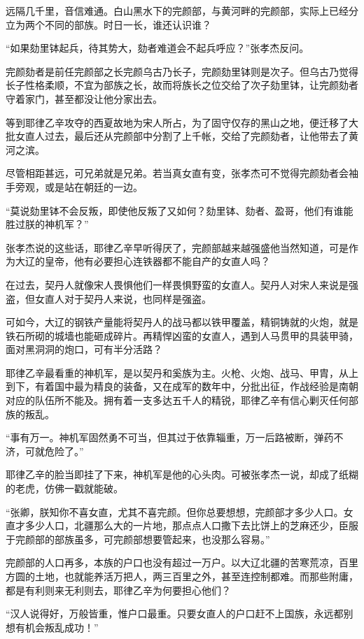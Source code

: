 远隔几千里，音信难通。白山黑水下的完颜部，与黄河畔的完颜部，实际上已经分立为两个不同的部族。时日一长，谁还认识谁？

“如果劾里钵起兵，待其势大，劾者难道会不起兵呼应？”张孝杰反问。

完颜劾者是前任完颜部之长完颜乌古乃长子，完颜劾里钵则是次子。但乌古乃觉得长子性格柔顺，不宜为部族之长，故而将族长之位交给了次子劾里钵，让完颜劾者守着家门，甚至都没让他分家出去。

等到耶律乙辛攻夺的西夏故地为宋人所占，为了固守仅存的黑山之地，便迁移了大批女直人过去，最后还从完颜部中分割了上千帐，交给了完颜劾者，让他带去了黄河之滨。

尽管相距甚远，可兄弟就是兄弟。若当真女直有变，张孝杰可不觉得完颜劾者会袖手旁观，或是站在朝廷的一边。

“莫说劾里钵不会反叛，即使他反叛了又如何？劾里钵、劾者、盈哥，他们有谁能胜过朕的神机军？”

张孝杰说的这些话，耶律乙辛早听得厌了，完颜部越来越强盛他当然知道，可是作为大辽的皇帝，他有必要担心连铁器都不能自产的女直人吗？

在过去，契丹人就像宋人畏惧他们一样畏惧野蛮的女直人。契丹人对宋人来说是强盗，但女直人对于契丹人来说，也同样是强盗。

可如今，大辽的钢铁产量能将契丹人的战马都以铁甲覆盖，精铜铸就的火炮，就是铁石所砌的城墙也能砸成碎片。再精悍凶蛮的女直人，遇到人马贯甲的具装甲骑，面对黑洞洞的炮口，可有半分活路？

耶律乙辛最看重的神机军，是以契丹和奚族为主。火枪、火炮、战马、甲胄，从上到下，有着国中最为精良的装备，又在成军的数年中，分批出征，作战经验是南朝对应的队伍所不能及。拥有着一支多达五千人的精锐，耶律乙辛有信心剿灭任何部族的叛乱。

“事有万一。神机军固然勇不可当，但其过于依靠辎重，万一后路被断，弹药不济，可就危险了。”

耶律乙辛的脸当即挂了下来，神机军是他的心头肉。可被张孝杰一说，却成了纸糊的老虎，仿佛一戳就能破。

“张卿，朕知你不喜女直，尤其不喜完颜。但你总要想想，完颜部才多少人口。女直才多少人口，北疆那么大的一片地，那点点人口撒下去比饼上的芝麻还少，臣服于完颜部的部族虽多，可完颜部想要管起来，也没那么容易。”

完颜部的人口再多，本族的户口也没有超过一万户。以大辽北疆的苦寒荒凉，百里方圆的土地，也就能养活万把人，两三百里之外，甚至连控制都难。而那些附庸，都是有利则来无利则去，耶律乙辛为何要担心他们？

“汉人说得好，万般皆重，惟户口最重。只要女直人的户口赶不上国族，永远都别想有机会叛乱成功！”

